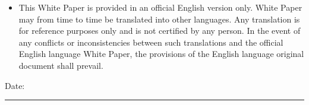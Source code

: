 \begin{declaration}
\begin{itemize}
\item This White Paper is provided in an official English version only. White Paper may from time to time be translated into
other languages. Any translation is for reference purposes only and is not certified by any person. In the event of any
conflicts or inconsistencies between such translations and the official English language White Paper, the provisions of
the English language original document shall prevail. 
\end{itemize}

\noindent Date:\\
\rule[0.5em]{25em}{0.5pt} %
\end{declaration}
